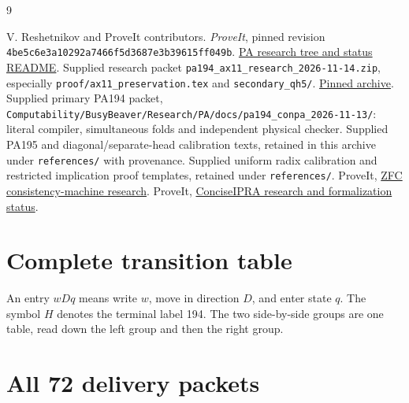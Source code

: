 \documentclass[11pt,letterpaper]{article}
\newcommand{\file}[1]{\texttt{\nolinkurl{#1}}}
\begin{document}
\begin{thebibliography}{9}
\raggedright
{} V. Reshetnikov and ProveIt contributors.
\emph{ProveIt}, pinned revision
\texttt{4be5c6e3a10292a7466f5d3687e3b39615ff049b}.
\href{https://github.com/VladimirReshetnikov/ProveIt/tree/4be5c6e3a10292a7466f5d3687e3b39615ff049b/Computability/BusyBeaver/Research/PA}{PA research tree and status README}.
 Supplied research packet
\file{pa194_ax11_research_2026-11-14.zip}, especially
\file{proof/ax11_preservation.tex} and \file{secondary_qh5/}.
\href{https://github.com/VladimirReshetnikov/ProveIt/blob/4be5c6e3a10292a7466f5d3687e3b39615ff049b/docs/incoming/pa194_ax11_research_2026-11-14.zip}{Pinned archive}.
 Supplied primary PA194 packet,
\file{Computability/BusyBeaver/Research/PA/docs/pa194_conpa_2026-11-13/}:
literal compiler, simultaneous folds and independent physical checker.
 Supplied PA195 and diagonal/separate-head calibration
texts, retained in this archive under \file{references/} with provenance.
 Supplied uniform radix calibration and restricted
implication proof templates, retained under \file{references/}.
 ProveIt,
\href{https://github.com/VladimirReshetnikov/ProveIt/tree/4be5c6e3a10292a7466f5d3687e3b39615ff049b/Computability/BusyBeaver/Research/ZFC}{ZFC consistency-machine research}.
 ProveIt,
\href{https://github.com/VladimirReshetnikov/ProveIt/tree/4be5c6e3a10292a7466f5d3687e3b39615ff049b/Logic/PrimitiveRecursiveArithmetic/ConciseIPRA}{ConciseIPRA research and formalization status}.
\end{thebibliography}

\clearpage\appendix
\section{Complete transition table}
\label{app:table}
An entry $wDq$ means write $w$, move in direction $D$, and enter state $q$.
The symbol $H$ denotes the terminal label 194. The two side-by-side groups
are one table, read down the left group and then the right group.


\clearpage
\section{All 72 delivery packets}
\label{app:packets}

\end{document}
